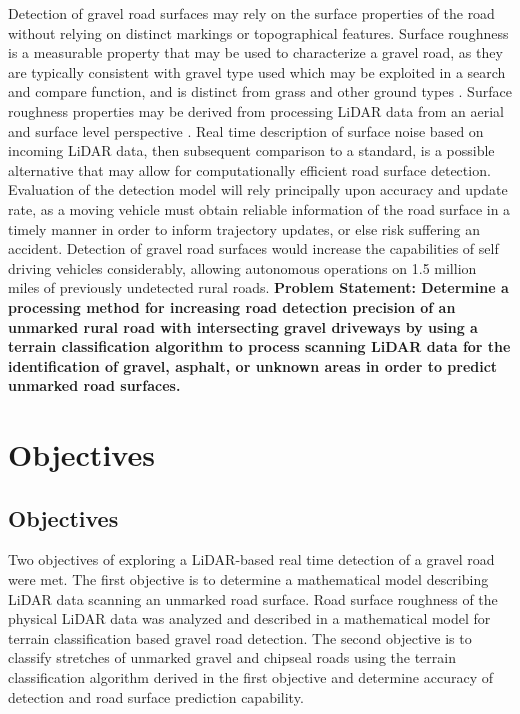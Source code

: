 \documentclass[numbered,pdftex]{ohio-etd}
\begin{document}
{	{Detection of gravel road surfaces may rely on the surface properties of the road without relying on distinct markings or topographical features. Surface roughness is a measurable property that may be used to characterize a gravel road, as they are typically consistent with gravel type used \cite{skorseth_gravel_nodate} which may be exploited in a search and compare function, and is distinct from grass and other ground types \cite{wan_road_2007, levi_3d_2012_light, levi_3d_2012_terrain}. Surface roughness properties may be derived from processing LiDAR data from an aerial and surface level perspective \cite{wan_road_2007, levi_3d_2012_light, levi_3d_2012_terrain, pollyea_experimental_2012,rychkov_computational_2012,lague_accurate_2013,brubaker_use_2013,turner_estimation_2014,campbell_lidar-based_2017,shepard_roughness_2001,tegowski_statistical_2016,sock_probabilistic_2016,milenkovic_roughness_2018,yadav_extraction_2017, yadav_rural_2018}. Real time description of surface noise based on incoming LiDAR data, then subsequent comparison to a standard, is a possible alternative that may allow for computationally efficient road surface detection. Evaluation of the detection model will rely principally upon accuracy and update rate, as a moving vehicle must obtain reliable information of the road surface in a timely manner in order to inform trajectory updates, or else risk suffering an accident. Detection of gravel road surfaces would increase the capabilities of self driving vehicles considerably, allowing autonomous operations on 1.5 million miles \cite{road_stats_2} of previously undetected rural roads. \textbf{Problem Statement: Determine a processing method for increasing road detection precision of an unmarked rural road with intersecting gravel driveways by using a terrain classification algorithm to process scanning LiDAR data for the identification of gravel, asphalt, or unknown areas in order to predict unmarked road surfaces.}
	
}

\chapter{Objectives}

\section{Objectives}

	{Two objectives of exploring a LiDAR-based real time detection of a gravel road were met. The first objective is to determine a mathematical model describing LiDAR data scanning an unmarked road surface. Road surface roughness of the physical LiDAR data was analyzed and described in a mathematical model for terrain classification based gravel road detection. The second objective is to classify stretches of unmarked gravel and chipseal roads using the terrain classification algorithm derived in the first objective and determine accuracy of detection and road surface prediction capability.}

}
\end{document}
